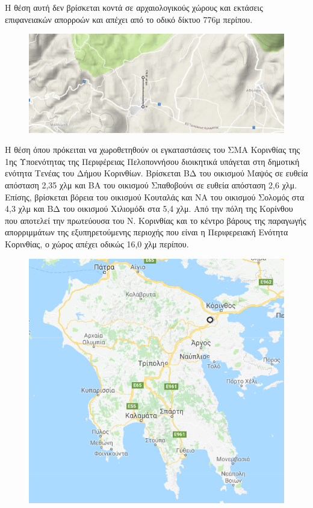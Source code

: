 \documentclass[12pt]{article}
\begin{document}
 	Η θέση αυτή δεν βρίσκεται κοντά σε αρχαιολογικούς χώρους και εκτάσεις επιφανειακών απορροών και απέχει από το οδικό δίκτυο 776μ περίπου.
 	
 	\begin{figure} [H]
 		\begin{center}
 			\includegraphics [scale = 0.30] {map40.png}
 		\end{center}
 	\end{figure}
 	
 	Η θέση όπου πρόκειται να χωροθετηθούν οι εγκαταστάσεις του ΣΜΑ Κορινθίας της 1ης  Υποενότητας της Περιφέρειας Πελοποννήσου διοικητικά υπάγεται στη δημοτική ενότητα Τενέας του Δήμου Κορινθίων. Βρίσκεται ΒΔ του οικισμού Μαψός σε ευθεία απόσταση 2,35 χλμ και ΒΑ του οικισμού Σπαθοβούνι σε ευθεία απόσταση 2,6 χλμ. Επίσης, βρίσκεται βόρεια του οικισμού Κουταλάς και ΝΑ του οικισμού Σολομός στα 4,3 χλμ και ΒΔ του οικισμού Χιλιομόδι στα 5,4 χλμ. Από την πόλη της Κορίνθου που αποτελεί την πρωτεύουσα του Ν. Κορινθίας και το κέντρο βάρους της παραγωγής απορριμμάτων της εξυπηρετούμενης περιοχής που είναι η Περιφερειακή Ενότητα Κορινθίας, ο χώρος απέχει οδικώς 16,0 χλμ περίπου.
 	
 	\begin{figure} [H]
 		\begin{center}
 			\includegraphics [scale = 0.50] {map38.png}
 		\end{center}
 	\end{figure}
 
\end{document}
